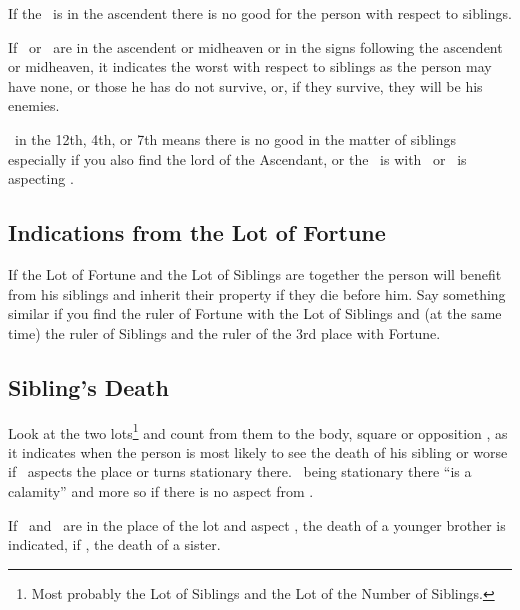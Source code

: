If the \Sun\, is in the ascendent there is no good for the person with respect to siblings.

If \Mars\, or \Saturn\, are in the ascendent or midheaven or in the signs following the ascendent or midheaven, it indicates the worst with respect to siblings as the person may have none, or those he has do not survive, or, if they survive, they will be his enemies.

\Mars\, in the 12th, 4th, or 7th means there is no good in the matter of siblings especially if you also find the lord of the Ascendant, or the \Moon\,  is with \Mars\, or \Mars\, is aspecting \Mercury.

\subsection{Indications from the Lot of Fortune}
If the Lot of Fortune and the Lot of Siblings are together the person will benefit from his siblings and inherit their property if they die before him. Say something similar if you find the ruler of Fortune with the Lot of Siblings and (at the same time) the ruler of Siblings  and the ruler of the 3rd place with Fortune.

\subsection{Sibling's Death}
Look at the two lots\footnote{Most probably the Lot of Siblings and the Lot of the Number of Siblings.} and count from them to the body, square or opposition \Saturn, as it indicates when the person is most likely to see the death of his sibling or worse if \Mars\, aspects the place or turns stationary there. \Mars\, being stationary there ``is a calamity'' and more so if there is no aspect from \Jupiter.

If \Saturn\, and \Mars\,  are in the place of the lot and aspect \Mercury, the death of a younger brother is indicated, if \Venus, the death of a sister.